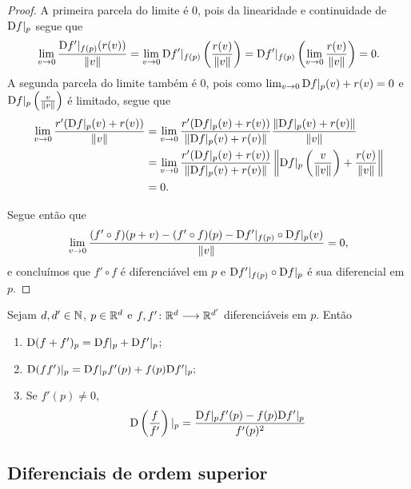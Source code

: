 \begin{proof}
A primeira parcela do limite é $0$, pois da linearidade e continuidade de $\mathrm{D} f|_p$ segue que
	\begin{equation*}
	\lim_{v \rightarrow 0} \frac{\mathrm{D} f'|_{f(p)} (r(v))}{\left\Vert{v}\right\Vert} = \lim_{v \rightarrow 0} \mathrm{D} f'|_{f(p)} \left( \frac{r(v)}{\left\Vert{v}\right\Vert} \right) = \mathrm{D} f'|_{f(p)} \left( \lim_{v \rightarrow 0} \frac{r(v)}{\left\Vert{v}\right\Vert} \right) = 0.
	\end{equation*}
A segunda parcela do limite também é $0$, pois como $\lim_{v \rightarrow 0} \mathrm{D} f|_p(v) + r(v) = 0$ e $\mathrm{D} f|_p \left( \frac{v}{\left\Vert{v}\right\Vert} \right)$ é limitado, segue que
	\begin{align*}
	\lim_{v \rightarrow 0} \frac{r'(\mathrm{D} f|_p(v) + r(v))}{\left\Vert{v}\right\Vert} &= \lim_{v \rightarrow 0} \frac{r'(\mathrm{D} f|_p(v) + r(v))}{\left\Vert{\mathrm{D}f|_p(v) + r(v)}\right\Vert} \frac{\left\Vert{\mathrm{D}f|_p(v) + r(v)}\right\Vert}{\left\Vert{v}\right\Vert}\\
		&= \lim_{v \rightarrow 0} \frac{r'(\mathrm{D} f|_p(v) + r(v))}{\left\Vert{\mathrm{D}f|_p(v) + r(v)}\right\Vert} \left\Vert{\mathrm{D}f|_p \left( \frac{v}{\left\Vert{v}\right\Vert} \right) + \frac{r(v)}{\left\Vert{v}\right\Vert}}\right\Vert \\
		&= 0.
	\end{align*}

Segue então que
	\begin{equation*}
	\lim_{v \rightarrow 0} \frac{(f' \circ f)(p+v) - (f' \circ f)(p) - \mathrm{D} f'|_{f(p)} \circ \mathrm{D} f|_p(v)}{\left\Vert{v}\right\Vert} = 0,
	\end{equation*}
e concluímos que $f' \circ f$ é diferenciável em $p$ e $\mathrm{D} f'|_{f(p)} \circ \mathrm{D} f|_p$ é sua diferencial em $p$.
\end{proof}

\begin{exercise}
Sejam $d,d' \in \mathbb{N}$, $p \in \mathbb{R}^d$ e ${f,f'}\colon {\mathbb{R}^d} \longrightarrow {\mathbb{R}^{d'}}$ diferenciáveis em $p$. Então
	\begin{enumerate}
	\item $\mathrm{D} (f+f')_p = \mathrm{D} f|_p + \mathrm{D} f'|_p$;
	\item $\mathrm{D} (ff')|_p = \mathrm{D} f|_p f'(p) + f(p)\mathrm{D} f'|_p;$
	\item Se $f'(p) \neq 0$,
	\begin{equation*}
	\mathrm{D} \left(\frac{f}{f'}\right)|_p = \frac{\mathrm{D} f|_p f'(p) - f(p)\mathrm{D} f'|_p}{f'(p)^2}
	\end{equation*}
	\end{enumerate}
\end{exercise}

\subsection{Diferenciais de ordem superior}

